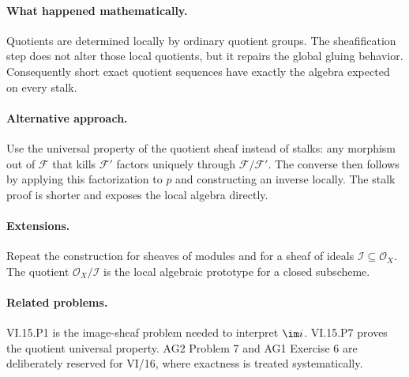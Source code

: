 \paragraph{What happened mathematically.}
Quotients are determined locally by ordinary quotient groups.  The sheafification step does
not alter those local quotients, but it repairs the global gluing behavior.  Consequently
short exact quotient sequences have exactly the algebra expected on every stalk.

\paragraph{Alternative approach.}
Use the universal property of the quotient sheaf instead of stalks: any morphism out of
$\mathcal F$ that kills $\mathcal F'$ factors uniquely through $\mathcal F/\mathcal F'$.
The converse then follows by applying this factorization to $p$ and constructing an inverse
locally.  The stalk proof is shorter and exposes the local algebra directly.

\paragraph{Extensions.}
Repeat the construction for sheaves of modules and for a sheaf of ideals
$\mathcal I\subseteq\mathcal O_X$.  The quotient $\mathcal O_X/\mathcal I$ is the local
algebraic prototype for a closed subscheme.

\paragraph{Related problems.}
VI.15.P1 is the image-sheaf problem needed to interpret $\im i$.  VI.15.P7 proves the
quotient universal property.  AG2 Problem 7 and AG1 Exercise 6 are deliberately reserved for
VI/16, where exactness is treated systematically.
\fi
